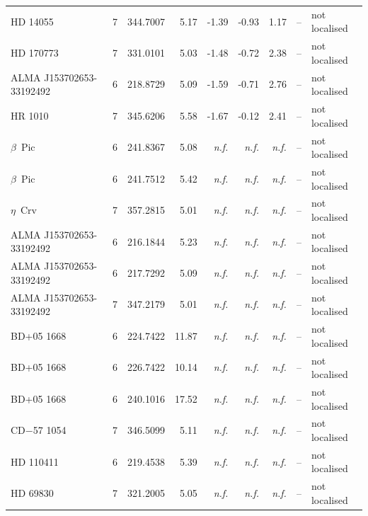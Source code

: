 \begin{tabular}{@{}l@{~}c@{~}r@{~}r@{~}r@{~}r@{~}r@{~}l@{~}l@{}}
HD 14055 & 7 & 344.7007 & 5.17 & -1.39 & -0.93 & 1.17 & -- & not localised \\
HD 170773 & 7 & 331.0101 & 5.03 & -1.48 & -0.72 & 2.38 & -- & not localised \\
ALMA J153702653-33192492 & 6 & 218.8729 & 5.09 & -1.59 & -0.71 & 2.76 & -- & not localised \\
HR 1010 & 7 & 345.6206 & 5.58 & -1.67 & -0.12 & 2.41 & -- & not localised \\
$\beta$~Pic & 6 & 241.8367 & 5.08 & \emph{n.f.} & \emph{n.f.} & \emph{n.f.} & -- & not localised \\
$\beta$~Pic & 6 & 241.7512 & 5.42 & \emph{n.f.} & \emph{n.f.} & \emph{n.f.} & -- & not localised \\
$\eta$~Crv & 7 & 357.2815 & 5.01 & \emph{n.f.} & \emph{n.f.} & \emph{n.f.} & -- & not localised \\
ALMA J153702653-33192492 & 6 & 216.1844 & 5.23 & \emph{n.f.} & \emph{n.f.} & \emph{n.f.} & -- & not localised \\
ALMA J153702653-33192492 & 6 & 217.7292 & 5.09 & \emph{n.f.} & \emph{n.f.} & \emph{n.f.} & -- & not localised \\
ALMA J153702653-33192492 & 7 & 347.2179 & 5.01 & \emph{n.f.} & \emph{n.f.} & \emph{n.f.} & -- & not localised \\
BD+05 1668 & 6 & 224.7422 & 11.87 & \emph{n.f.} & \emph{n.f.} & \emph{n.f.} & -- & not localised \\
BD+05 1668 & 6 & 226.7422 & 10.14 & \emph{n.f.} & \emph{n.f.} & \emph{n.f.} & -- & not localised \\
BD+05 1668 & 6 & 240.1016 & 17.52 & \emph{n.f.} & \emph{n.f.} & \emph{n.f.} & -- & not localised \\
CD$-$57 1054 & 7 & 346.5099 & 5.11 & \emph{n.f.} & \emph{n.f.} & \emph{n.f.} & -- & not localised \\
HD 110411 & 6 & 219.4538 & 5.39 & \emph{n.f.} & \emph{n.f.} & \emph{n.f.} & -- & not localised \\
HD 69830 & 7 & 321.2005 & 5.05 & \emph{n.f.} & \emph{n.f.} & \emph{n.f.} & -- & not localised \\
\hline
\end{tabular}
